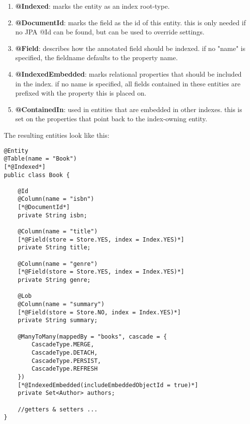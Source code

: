 \begin{enumerate}
	\item \textbf{@Indexed}: marks the entity as an index root-type.
	\item \textbf{@DocumentId}: marks the field as the id of this entity. this is only needed if no JPA @Id can be found, but can be used to override settings.
	\item \textbf{@Field}: describes how the annotated field should be indexed. if no "name" is specified, the fieldname defaults to the property name.
	\item \textbf{@IndexedEmbedded}: marks relational properties that should be included in the index. if no name is specified, all fields contained in these entities are prefixed with the property this is placed on.
	\item \textbf{@ContainedIn}: used in entities that are embedded in other indexes. this is set on the properties that point back to the index-owning entity.
\end{enumerate}
\noindent
The resulting entities look like this:
\\
\lstset{language=java}
\begin{lstlisting}[frame=htrbl, caption={Book.java with Hibernate Search annotations}, label={lst:book.java_2}]
@Entity
@Table(name = "Book")
[*@Indexed*]
public class Book {

	@Id
	@Column(name = "isbn")
	[*@DocumentId*]
	private String isbn;
	
	@Column(name = "title")
	[*@Field(store = Store.YES, index = Index.YES)*]
	private String title;
	
	@Column(name = "genre")
	[*@Field(store = Store.YES, index = Index.YES)*]
	private String genre;
	
	@Lob
	@Column(name = "summary")
	[*@Field(store = Store.NO, index = Index.YES)*]
	private String summary;
	
	@ManyToMany(mappedBy = "books", cascade = {
		CascadeType.MERGE,
		CascadeType.DETACH,
		CascadeType.PERSIST,
		CascadeType.REFRESH
	})
	[*@IndexedEmbedded(includeEmbeddedObjectId = true)*]
	private Set<Author> authors;
	
	//getters & setters ...
}
\end{lstlisting}

